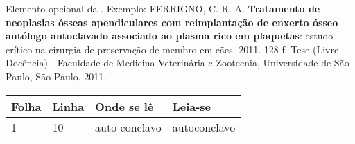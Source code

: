 \documentclass[12pt,openright,twoside,a4paper]{abntex2}
\begin{document}
\begin{errata}
Elemento opcional da . Exemplo:
\vspace{\onelineskip}
FERRIGNO, C. R. A. \textbf{Tratamento de neoplasias ósseas apendiculares com
reimplantação de enxerto ósseo autólogo autoclavado associado ao plasma
rico em plaquetas}: estudo crítico na cirurgia de preservação de membro em
cães. 2011. 128 f. Tese (Livre-Docência) - Faculdade de Medicina Veterinária e
Zootecnia, Universidade de São Paulo, São Paulo, 2011.

\begin{table}[htb]
\center
\footnotesize
\begin{tabular}{|p{1.4cm}|p{1cm}|p{3cm}|p{3cm}|}
  \hline
   \textbf{Folha} & \textbf{Linha}  & \textbf{Onde se lê}  & \textbf{Leia-se}  \\
    \hline
    1 & 10 & auto-conclavo & autoconclavo\\
   \hline
\end{tabular}
\end{table}

\end{errata}

\end{document}
